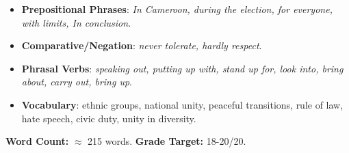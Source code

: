\documentclass[11pt]{article}
\newcommand{\cle}[1]{{\popxbold\color{popdark}#1}}
\begin{document}
\begin{exoresolu}
\begin{itemize}
        \item \textbf{Prepositional Phrases}: \emph{In Cameroon, during the election, for everyone, with limits, In conclusion}.
        \item \textbf{Comparative/Negation}: \emph{never tolerate, hardly respect}.
        \item \textbf{Phrasal Verbs}: \emph{speaking out, putting up with, stand up for, look into, bring about, carry out, bring up}.
        \item \textbf{Vocabulary}: \cle{ethnic groups, national unity, peaceful transitions, rule of law, hate speech, civic duty, unity in diversity}.
    \end{itemize}
    \textbf{Word Count:} $\approx$ 215 words. \textbf{Grade Target:} 18-20/20.
\end{exoresolu}
\end{document}
